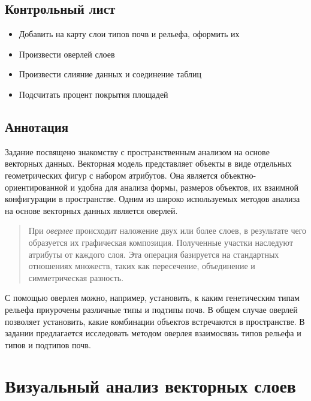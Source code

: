 \documentclass[12pt,]{book}
\providecommand{\tightlist}{%
  \setlength{\itemsep}{0pt}\setlength{\parskip}{0pt}}
\begin{document}
\hypertarget{overlay-control}{%
\subsection{Контрольный лист}\label{overlay-control}}

\begin{itemize}
\tightlist
\item
  Добавить на карту слои типов почв и рельефа, оформить их
\item
  Произвести оверлей слоев
\item
  Произвести слияние данных и соединение таблиц
\item
  Подсчитать процент покрытия площадей
\end{itemize}

\hypertarget{overlay-annotation}{%
\subsection{Аннотация}\label{overlay-annotation}}

Задание посвящено знакомству с пространственным анализом на основе векторных данных. Векторная модель представляет объекты в виде отдельных геометрических фигур с набором атрибутов. Она является объектно-ориентированной и удобна для анализа формы, размеров объектов, их взаимной конфигурации в пространстве. Одним из широко используемых методов анализа на основе векторных данных является оверлей.

\begin{quote}
При \emph{оверлее} происходит наложение двух или более слоев, в результате чего образуется их графическая композиция. Полученные участки наследуют атрибуты от каждого слоя. Эта операция базируется на стандартных отношениях множеств, таких как пересечение, объединение и симметрическая разность.
\end{quote}

С помощью оверлея можно, например, установить, к каким генетическим типам рельефа приурочены различные типы и подтипы почв. В общем случае оверлей позволяет установить, какие комбинации объектов встречаются в пространстве. В задании предлагается исследовать методом оверлея взаимосвязь типов рельефа и типов и подтипов почв.

\hypertarget{overlay-vectors}{%
\section{Визуальный анализ векторных слоев}\label{overlay-vectors}}
\end{document}
